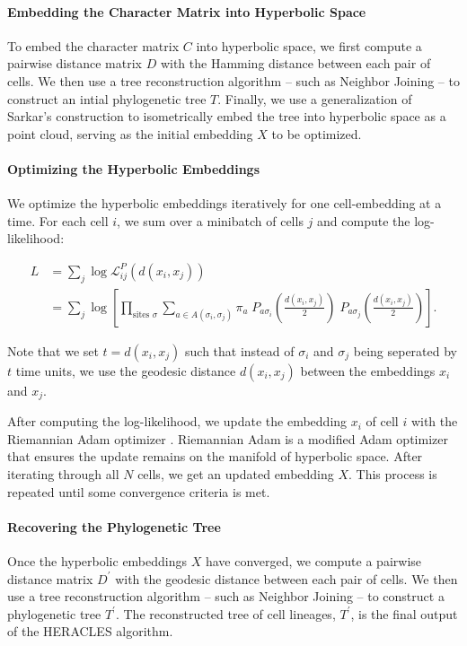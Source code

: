 \documentclass{article}
\begin{document}
\paragraph*{Embedding the Character Matrix into Hyperbolic Space} To embed the character matrix $C$ into hyperbolic space, we first compute a pairwise distance matrix $D$ with the Hamming distance between each pair of cells. We then use a tree reconstruction algorithm -- such as Neighbor Joining -- to construct an intial phylogenetic tree $T$. Finally, we use a generalization of Sarkar's construction \cite{sarkar2012low} \cite{sala2018representation} to isometrically embed the tree into hyperbolic space as a point cloud, serving as the initial embedding $X$ to be optimized.

\paragraph*{Optimizing the Hyperbolic Embeddings} We optimize the hyperbolic embeddings iteratively for one cell-embedding at a time. For each cell $i$, we sum over a minibatch of cells $j$ and compute the log-likelihood:

\begin{align}
  \label{eq:log-likelihood}
  L &= \sum_{j} \log \mathcal{L}_{ij}^P \left( d(x_i, x_j) \right) \\
  &= \sum_{j} \log \left[ \prod_{\textrm{sites } \sigma} \sum_{a \in A(\sigma_i, \sigma_j)} \pi_a \; P_{a \sigma_i} \left( \frac{ d(x_i, x_j)}{2} \right) \;   P_{a \sigma_j} \left( \frac{ d(x_i, x_j)}{2} \right) \right].
\end{align}

Note that we set $t=d(x_i, x_j)$ such that instead of $\sigma_i$ and $\sigma_j$ being seperated by $t$ time units, we use the geodesic distance $d(x_i, x_j)$ between the embeddings $x_i$ and $x_j$.

After computing the log-likelihood, we update the embedding $x_i$ of cell $i$ with the Riemannian Adam optimizer \cite{becigneul2018riemannian}. Riemannian Adam is a modified Adam optimizer \cite{kingma2014adam} that ensures the update remains on the manifold of hyperbolic space. After iterating through all $N$ cells, we get an updated embedding $X$. This process is repeated until some convergence criteria is met.

\paragraph*{Recovering the Phylogenetic Tree} Once the hyperbolic embeddings $X$ have converged, we compute a pairwise distance matrix $D^\prime$ with the geodesic distance between each pair of cells. We then use a tree reconstruction algorithm -- such as Neighbor Joining -- to construct a phylogenetic tree $T^\prime$. The reconstructed tree of cell lineages, $T^\prime$, is the final output of the HERACLES algorithm.
\end{document}
